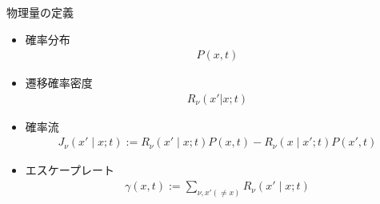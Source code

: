 \documentclass{beamer}
\begin{document}
\begin{frame}{物理量の定義}
    \begin{itemize}
        \item 確率分布
        \begin{align}
            P(x,t)
        \end{align}
        \item 遷移確率密度
        \begin{align}
            R_\nu(x'|x;t)
        \end{align}
        \item 確率流
        \begin{align}
            J_\nu(x'\mid x;t):=R_\nu(x'\mid x;t)P(x,t)-R_\nu(x\mid x';t)P(x',t)
        \end{align}
        \item エスケープレート
        \begin{align}
            \gamma(x,t):=\sum_{\nu,x'(\neq x)}R_\nu(x'\mid x;t)
        \end{align}
    \end{itemize}
\end{frame}
\end{document}
